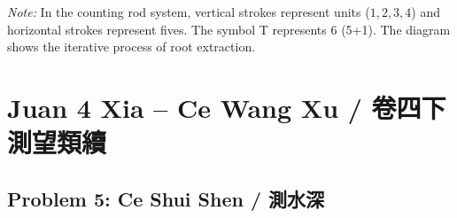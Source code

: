 \documentclass[11pt,a4paper]{article}
\begin{document}
\textit{Note:} In the counting rod system, vertical strokes represent units 
($1,2,3,4$) and horizontal strokes represent fives. The symbol T 
represents 6 (5+1). The diagram shows the iterative process of root extraction.

\newpage

\section{Juan 4 Xia -- Ce Wang Xu / 卷四下測望類續}
\label{sec:juan4xia}

\subsection*{Problem 5: Ce Shui Shen / 測水深}
\end{document}
